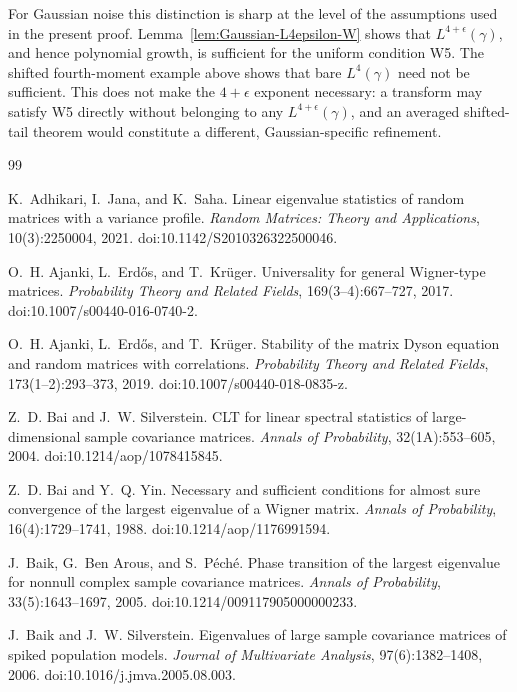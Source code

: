 \documentclass[11pt]{article}
\theoremstyle{definition}
\theoremstyle{remark}
\begin{document}
For Gaussian noise this distinction is sharp at the level of the assumptions
used in the present proof.  Lemma~\ref{lem:Gaussian-L4epsilon-W} shows that
$L^{4+\epsilon}(\gamma)$, and hence polynomial growth, is sufficient for the
uniform condition W5.  The shifted fourth-moment example above shows that
bare $L^4(\gamma)$ need not be sufficient.  This does not make the
$4+\epsilon$ exponent necessary: a transform may satisfy W5 directly without
belonging to any $L^{4+\epsilon}(\gamma)$, and an averaged shifted-tail theorem
would constitute a different, Gaussian-specific refinement.
\begin{thebibliography}{99}

K.~Adhikari, I.~Jana, and K.~Saha.
\newblock Linear eigenvalue statistics of random matrices with a variance profile.
\newblock \emph{Random Matrices: Theory and Applications}, 10(3):2250004, 2021.
\newblock doi:10.1142/S2010326322500046.

O.~H. Ajanki, L.~Erd\H{o}s, and T.~Kr\"uger.
\newblock Universality for general Wigner-type matrices.
\newblock \emph{Probability Theory and Related Fields}, 169(3--4):667--727, 2017.
\newblock doi:10.1007/s00440-016-0740-2.

O.~H. Ajanki, L.~Erd\H{o}s, and T.~Kr\"uger.
\newblock Stability of the matrix Dyson equation and random matrices with correlations.
\newblock \emph{Probability Theory and Related Fields}, 173(1--2):293--373, 2019.
\newblock doi:10.1007/s00440-018-0835-z.

Z.~D. Bai and J.~W. Silverstein.
\newblock CLT for linear spectral statistics of large-dimensional sample covariance matrices.
\newblock \emph{Annals of Probability}, 32(1A):553--605, 2004.
\newblock doi:10.1214/aop/1078415845.

Z.~D. Bai and Y.~Q. Yin.
\newblock Necessary and sufficient conditions for almost sure convergence of
the largest eigenvalue of a Wigner matrix.
\newblock \emph{Annals of Probability}, 16(4):1729--1741, 1988.
\newblock doi:10.1214/aop/1176991594.

J.~Baik, G.~Ben Arous, and S.~P\'{e}ch\'{e}.
\newblock Phase transition of the largest eigenvalue for nonnull complex sample covariance matrices.
\newblock \emph{Annals of Probability}, 33(5):1643--1697, 2005.
\newblock doi:10.1214/009117905000000233.

J.~Baik and J.~W. Silverstein.
\newblock Eigenvalues of large sample covariance matrices of spiked population models.
\newblock \emph{Journal of Multivariate Analysis}, 97(6):1382--1408, 2006.
\newblock doi:10.1016/j.jmva.2005.08.003.


\end{thebibliography}
\end{document}

